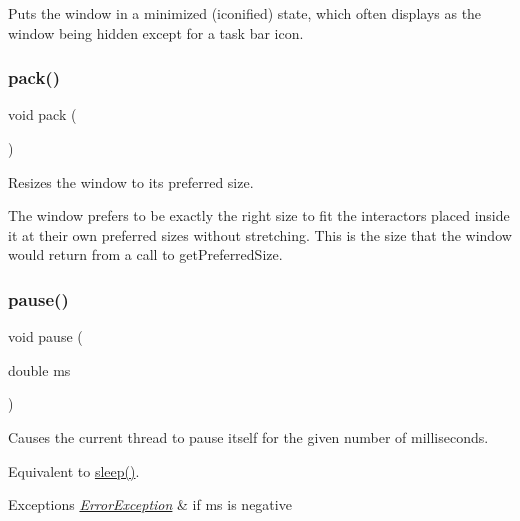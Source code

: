 Puts the window in a minimized (iconified) state, which often displays as the window being hidden except for a task bar icon. 

\mbox{\label{classGWindow_a915ffc82b17862ab1d2a466a79d23a3f}} 
\subsubsection{\texorpdfstring{pack()}{pack()}}
{\footnotesize\ttfamily void pack (\begin{DoxyParamCaption}{ }\end{DoxyParamCaption})\hspace{0.3cm}{\ttfamily [virtual]}}



Resizes the window to its preferred size. 

The window prefers to be exactly the right size to fit the interactors placed inside it at their own preferred sizes without stretching. This is the size that the window would return from a call to get\+Preferred\+Size. \mbox{\label{classGWindow_adc7d99bb2dc43b8337e89b7d54cab9d3}} 
\subsubsection{\texorpdfstring{pause()}{pause()}}
{\footnotesize\ttfamily void pause (\begin{DoxyParamCaption}\item[{double}]{ms }\end{DoxyParamCaption})\hspace{0.3cm}{\ttfamily [virtual]}}



Causes the current thread to pause itself for the given number of milliseconds. 

Equivalent to \mbox{\hyperlink{classGWindow_aa3381590c1ef33c08000c2fbb2bf0dd0}{sleep()}}. 
\begin{DoxyExceptions}{Exceptions}
{\em \mbox{\hyperlink{classErrorException}{Error\+Exception}}} & if ms is negative \\
\hline
\end{DoxyExceptions}
\mbox{\label{classGWindow_a1c12b1fde5c2ef10d79d4ee51e670efa}} 
